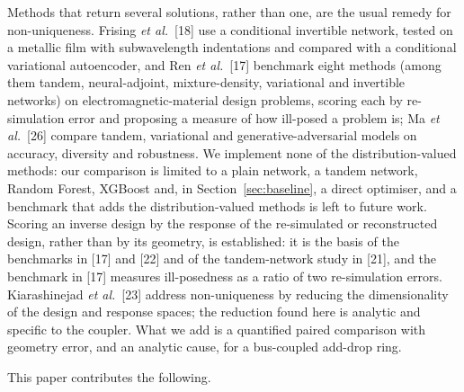 \documentclass[11pt]{article}
\begin{document}
Methods that return several solutions, rather than one, are the usual remedy for non-uniqueness. Frising \emph{et al.}\ [18] use a conditional invertible network, tested on a metallic film with subwavelength indentations and compared with a conditional variational autoencoder, and Ren \emph{et al.}\ [17] benchmark eight methods (among them tandem, neural-adjoint, mixture-density, variational and invertible networks) on electromagnetic-material design problems, scoring each by re-simulation error and proposing a measure of how ill-posed a problem is; Ma \emph{et al.}\ [26] compare tandem, variational and generative-adversarial models on accuracy, diversity and robustness. We implement none of the distribution-valued methods: our comparison is limited to a plain network, a tandem network, Random Forest, XGBoost and, in Section~\ref{sec:baseline}, a direct optimiser, and a benchmark that adds the distribution-valued methods is left to future work. Scoring an inverse design by the response of the re-simulated or reconstructed design, rather than by its geometry, is established: it is the basis of the benchmarks in [17] and [22] and of the tandem-network study in [21], and the benchmark in [17] measures ill-posedness as a ratio of two re-simulation errors. Kiarashinejad \emph{et al.}\ [23] address non-uniqueness by reducing the dimensionality of the design and response spaces; the reduction found here is analytic and specific to the coupler. What we add is a quantified paired comparison with geometry error, and an analytic cause, for a bus-coupled add-drop ring.

This paper contributes the following.
\end{document}
